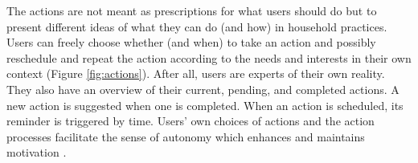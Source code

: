 The actions are not meant as prescriptions for what users should do but to present different ideas of what they can do (and how) in household practices. 
Users can freely choose whether (and when) to take an action and possibly reschedule and repeat the action according to the needs and interests in their own context (Figure \ref{fig:actions}). After all, users are experts of their own reality. They also have an overview of their current, pending, and completed actions.
A new action is suggested when one is completed. %
When an action is scheduled, its reminder is triggered by time. Users' own choices of actions and the action processes facilitate the sense of autonomy which enhances and maintains motivation \cite{Ryan2000}. \\

